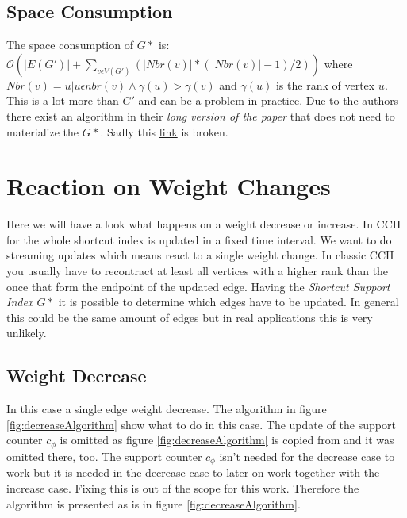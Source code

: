 \documentclass[twocolumn]{article}
\begin{document}
\subsection{Space Consumption} \label{Space Consumption}

The space consumption of $G*$ is: 
\\
$\mathcal{O}(\vert E(G') \vert + \sum_{v \epsilon  V(G')}(\vert Nbr(v) \vert * (\vert Nbr(v) \vert-1)/2))$
where $Nbr(v) = {u\vert u \epsilon nbr(v) \land \gamma(u) > \gamma(v) }$ and $\gamma(u)$ is the rank of vertex $u$.
This is a lot more than $G'$ and can be a problem in practice. Due to the authors there exist an algorithm in their
\textit{long version of the paper} that does not need to materialize the $G*$. Sadly this 
\href{https://www.dropbox.com/s/3s7n9u1sv315785/DynSDist.pdf?dl=0}{link} is broken. 


\section{Reaction on Weight Changes}

Here we will have a look what happens on a weight decrease or increase. 
In CCH for the whole shortcut index is updated in a fixed time interval. We want to 
do streaming updates which means react to a single weight change. In classic
CCH you usually have to recontract at least all vertices with a higher rank than
the once that form the endpoint of the updated edge. Having the \textit{Shortcut Support Index $G*$}
it is possible to determine which edges have to be updated. In general this could
be the same amount of edges but in real applications this is very unlikely.

\subsection{Weight Decrease}

In this case a single edge weight decrease. The algorithm in figure \ref{fig:decreaseAlgorithm} 
show what to do in this case. The update of the support counter $c_{\phi}$ is omitted as
figure \ref{fig:decreaseAlgorithm} is copied from \cite{Ouyang2020} and it was omitted there, too. The support counter $c_{\phi}$
isn't needed for the decrease case to work but it is needed in the decrease case to later on 
work together with the increase case. Fixing this is out of the scope for this work. Therefore the 
algorithm is presented as is in figure \ref{fig:decreaseAlgorithm}. 
\end{document}
